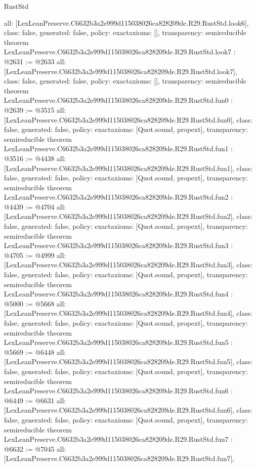 \begin{lexlean}{RustStd}
\begin{coremodule}
{  all: [LexLeanPreserve.C6632b3a2e999d115038026ca828209de.R29.RustStd.look6],
  class: false,
  generated: false,
  policy: exact{axioms: []},
  transparency: semireducible
}
theorem LexLeanPreserve.C6632b3a2e999d115038026ca828209de.R29.RustStd.look7 : @2631 := @2633 {
  all: [LexLeanPreserve.C6632b3a2e999d115038026ca828209de.R29.RustStd.look7],
  class: false,
  generated: false,
  policy: exact{axioms: []},
  transparency: semireducible
}
theorem LexLeanPreserve.C6632b3a2e999d115038026ca828209de.R29.RustStd.fun0 : @2639 := @3515 {
  all: [LexLeanPreserve.C6632b3a2e999d115038026ca828209de.R29.RustStd.fun0],
  class: false,
  generated: false,
  policy: exact{axioms: [Quot.sound, propext]},
  transparency: semireducible
}
theorem LexLeanPreserve.C6632b3a2e999d115038026ca828209de.R29.RustStd.fun1 : @3516 := @4438 {
  all: [LexLeanPreserve.C6632b3a2e999d115038026ca828209de.R29.RustStd.fun1],
  class: false,
  generated: false,
  policy: exact{axioms: [Quot.sound, propext]},
  transparency: semireducible
}
theorem LexLeanPreserve.C6632b3a2e999d115038026ca828209de.R29.RustStd.fun2 : @4439 := @4704 {
  all: [LexLeanPreserve.C6632b3a2e999d115038026ca828209de.R29.RustStd.fun2],
  class: false,
  generated: false,
  policy: exact{axioms: [Quot.sound, propext]},
  transparency: semireducible
}
theorem LexLeanPreserve.C6632b3a2e999d115038026ca828209de.R29.RustStd.fun3 : @4705 := @4999 {
  all: [LexLeanPreserve.C6632b3a2e999d115038026ca828209de.R29.RustStd.fun3],
  class: false,
  generated: false,
  policy: exact{axioms: [Quot.sound, propext]},
  transparency: semireducible
}
theorem LexLeanPreserve.C6632b3a2e999d115038026ca828209de.R29.RustStd.fun4 : @5000 := @5668 {
  all: [LexLeanPreserve.C6632b3a2e999d115038026ca828209de.R29.RustStd.fun4],
  class: false,
  generated: false,
  policy: exact{axioms: [Quot.sound, propext]},
  transparency: semireducible
}
theorem LexLeanPreserve.C6632b3a2e999d115038026ca828209de.R29.RustStd.fun5 : @5669 := @6448 {
  all: [LexLeanPreserve.C6632b3a2e999d115038026ca828209de.R29.RustStd.fun5],
  class: false,
  generated: false,
  policy: exact{axioms: [Quot.sound, propext]},
  transparency: semireducible
}
theorem LexLeanPreserve.C6632b3a2e999d115038026ca828209de.R29.RustStd.fun6 : @6449 := @6631 {
  all: [LexLeanPreserve.C6632b3a2e999d115038026ca828209de.R29.RustStd.fun6],
  class: false,
  generated: false,
  policy: exact{axioms: [Quot.sound, propext]},
  transparency: semireducible
}
theorem LexLeanPreserve.C6632b3a2e999d115038026ca828209de.R29.RustStd.fun7 : @6632 := @7045 {
  all: [LexLeanPreserve.C6632b3a2e999d115038026ca828209de.R29.RustStd.fun7],
}
\end{coremodule}
\end{lexlean}
